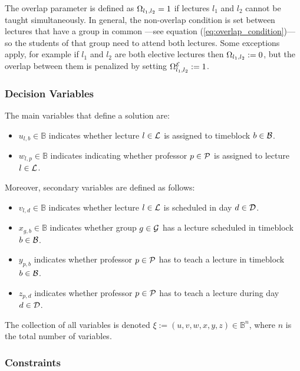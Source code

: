     The overlap parameter is defined as $\Omega_{l_1,l_2}=1$ if lectures $l_1$ and $l_2$ cannot be taught simultaneously. In general, the non-overlap condition is set between lectures that have a group in common —see equation (\ref{eq:overlap_condition})— so the students of that group need to attend both lectures. Some exceptions apply, for example if $l_1$ and $l_2$ are both elective lectures then $\Omega_{l_1,l_2}:=0$, but the overlap between them is penalized by setting $\Omega_{l_1,l_2}^{\mathcal{E}}:=1$.




    \vspace{1em}

    \subsubsection{Decision Variables}

    The main variables that define a solution are:
    \begin{itemize}
        \item $u_{l,b}\in\mathbb{B}$ indicates whether lecture $l\in\mathcal{L}$ is assigned to timeblock $b\in\mathcal{B}$.
        \item $w_{l,p}\in\mathbb{B}$ indicates indicating whether professor $p\in\mathcal{P}$ is assigned to lecture $l\in\mathcal{L}$.
    \end{itemize}

    Moreover, secondary variables are defined as follows:
    \begin{itemize}
        \item $v_{l,d}\in\mathbb{B}$ indicates whether lecture $l\in\mathcal{L}$ is scheduled in day $d\in\mathcal{D}$.
        \item $x_{g,b}\in\mathbb{B}$ indicates whether group $g\in\mathcal{G}$ has a lecture scheduled in timeblock $b\in\mathcal{B}$.
        \item $y_{p,b}$ indicates whether professor $p\in\mathcal{P}$ has to teach a lecture in timeblock $b\in\mathcal{B}$.
        \item $z_{p,d}$ indicates whether professor $p\in\mathcal{P}$ has to teach a lecture during day $d\in\mathcal{D}$.
    \end{itemize}

    The collection of all  variables is denoted $\xi:=(u,v,w,x,y,z)\in\mathbb{B}^n$, where $n$ is the total number of variables.
        
    

\subsubsection{Constraints}

